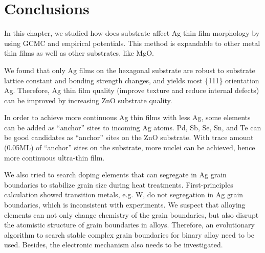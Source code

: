 \section{Conclusions}
In this chapter, we studied how does substrate affect Ag thin film morphology by using \ac{GCMC} and empirical potentials. This method is expandable to other metal thin films as well as other substrates, like MgO.

We found that only Ag films on the hexagonal substrate are robust to substrate lattice constant and bonding strength changes, and yields most \{111\} orientation Ag. Therefore, Ag thin film quality (improve texture and reduce internal defects) can be improved by increasing ZnO substrate quality. 

In order to achieve more continuous Ag thin films with less Ag, some elements can be added as ``anchor'' sites to incoming Ag atoms. Pd, Sb, Se, Sn, and Te can be good candidates as ``anchor'' sites on the ZnO substrate. With trace amount (0.05\ac{ML}) of ``anchor'' sites on the substrate, more nuclei can be achieved, hence more continuous ultra-thin film.

We also tried to search doping elements that can segregate in Ag grain boundaries to stabilize grain size during heat treatments. First-principles calculation showed transition metals, e.g. W, do not segregation in Ag grain boundaries, which is inconsistent with experiments. We suspect that alloying elements can not only change chemistry of the grain boundaries, but also disrupt the atomistic structure of grain boundaries in alloys. Therefore, an evolutionary algorithm to search stable complex grain boundaries for binary alloy need to be used. Besides, the electronic mechanism also needs to be investigated.